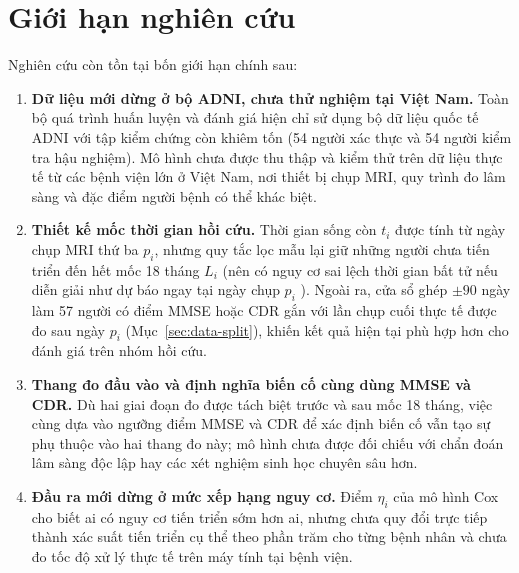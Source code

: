 \section{Giới hạn nghiên cứu}
\label{sec:study-limitations}
Nghiên cứu còn tồn tại bốn giới hạn chính sau:
\begin{enumerate}[itemsep=0.15em,topsep=0.25em]
\item \textbf{Dữ liệu mới dừng ở bộ ADNI, chưa thử nghiệm tại Việt Nam.} Toàn bộ quá trình huấn luyện và đánh giá hiện chỉ sử dụng bộ dữ liệu quốc tế ADNI với tập kiểm chứng còn khiêm tốn (54 người xác thực và 54 người kiểm tra hậu nghiệm). Mô hình chưa được thu thập và kiểm thử trên dữ liệu thực tế từ các bệnh viện lớn ở Việt Nam, nơi thiết bị chụp MRI, quy trình đo lâm sàng và đặc điểm người bệnh có thể khác biệt.
\item \textbf{Thiết kế mốc thời gian hồi cứu.} Thời gian sống còn $t_i$ được tính từ ngày chụp MRI thứ ba $p_i$, nhưng quy tắc lọc mẫu lại giữ những người chưa tiến triển đến hết mốc 18 tháng $L_i$ (nên có nguy cơ sai lệch thời gian bất tử nếu diễn giải như dự báo ngay tại ngày chụp $p_i$ \cite{suissa2008immortal}). Ngoài ra, cửa sổ ghép $\pm90$ ngày làm 57 người có điểm MMSE hoặc CDR gắn với lần chụp cuối thực tế được đo sau ngày $p_i$ (Mục~\ref{sec:data-split}), khiến kết quả hiện tại phù hợp hơn cho đánh giá trên nhóm hồi cứu.
\item \textbf{Thang đo đầu vào và định nghĩa biến cố cùng dùng MMSE và CDR.} Dù hai giai đoạn đo được tách biệt trước và sau mốc 18 tháng, việc cùng dựa vào ngưỡng điểm MMSE và CDR để xác định biến cố vẫn tạo sự phụ thuộc vào hai thang đo này; mô hình chưa được đối chiếu với chẩn đoán lâm sàng độc lập hay các xét nghiệm sinh học chuyên sâu hơn.
\item \textbf{Đầu ra mới dừng ở mức xếp hạng nguy cơ.} Điểm $\eta_i$ của mô hình Cox cho biết ai có nguy cơ tiến triển sớm hơn ai, nhưng chưa quy đổi trực tiếp thành xác suất tiến triển cụ thể theo phần trăm cho từng bệnh nhân và chưa đo tốc độ xử lý thực tế trên máy tính tại bệnh viện.
\end{enumerate}

